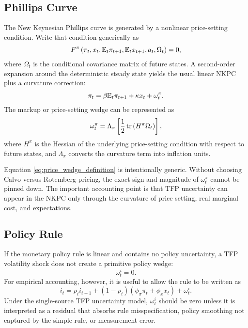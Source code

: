 \subsection{Phillips Curve}

The New Keynesian Phillips curve is generated by a nonlinear price-setting
condition. Write that condition generically as
\begin{equation}
    F^\pi
    \left(
        \pi_t,
        x_t,
        \mathbb{E}_t \pi_{t+1},
        \mathbb{E}_t x_{t+1},
        a_t,
        \Omega_t
    \right)
    =
    0,
    \label{eq:generic_price_setting}
\end{equation}
where \(\Omega_t\) is the conditional covariance matrix of future states. A
second-order expansion around the deterministic steady state yields the usual
linear NKPC plus a curvature correction:
\begin{equation}
    \pi_t
    =
    \beta \mathbb{E}_t \pi_{t+1}
    +
    \kappa x_t
    +
    \omega^\pi_t.
    \label{eq:nkpc_with_wedge}
\end{equation}
The markup or price-setting wedge can be represented as
\begin{equation}
    \omega^\pi_t
    =
    \Lambda_\pi
    \left[
        \frac{1}{2}
        \operatorname{tr}
        \left(
            H^\pi \Omega_t
        \right)
    \right],
    \label{eq:price_wedge_definition}
\end{equation}
where \(H^\pi\) is the Hessian of the underlying price-setting condition with
respect to future states, and \(\Lambda_\pi\) converts the curvature term into
inflation units.

Equation \eqref{eq:price_wedge_definition} is intentionally generic. Without
choosing Calvo versus Rotemberg pricing, the exact sign and magnitude of
\(\omega^\pi_t\) cannot be pinned down. The important accounting point is that
TFP uncertainty can appear in the NKPC only through the curvature of price
setting, real marginal cost, and expectations.

\subsection{Policy Rule}

If the monetary policy rule is linear and contains no policy uncertainty, a TFP
volatility shock does not create a primitive policy wedge:
\begin{equation}
    \omega^i_t = 0.
    \label{eq:no_policy_wedge}
\end{equation}
For empirical accounting, however, it is useful to allow the rule to be written
as
\begin{equation}
    i_t
    =
    \rho_i i_{t-1}
    +
    (1-\rho_i)
    \left(
        \phi_\pi \pi_t+\phi_x x_t
    \right)
    +
    \omega^i_t.
    \label{eq:taylor_with_wedge}
\end{equation}
Under the single-source TFP uncertainty model, \(\omega^i_t\) should be zero
unless it is interpreted as a residual that absorbs rule misspecification,
policy smoothing not captured by the simple rule, or measurement error.
